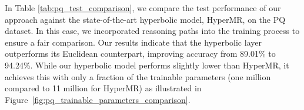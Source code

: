 \documentclass[11pt]{article}
\begin{document}
In Table \ref{tab:pq_test_comparison}, we compare the test performance of our approach against the state-of-the-art hyperbolic model, HyperMR, on the PQ dataset. In this case, we incorporated reasoning paths into the training process to ensure a fair comparison. Our results indicate that the hyperbolic layer outperforms its Euclidean counterpart, improving accuracy from 89.01\% to 94.24\%. While our hyperbolic model performs slightly lower than HyperMR, it achieves this with only a fraction of the trainable parameters (one million compared to 11 million for HyperMR) as illustrated in Figure~\ref{fig:pq_trainable_parameters_comparison}. 
\end{document}
